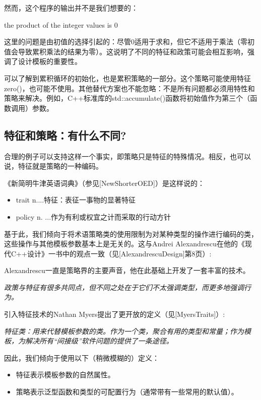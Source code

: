然而，这个程序的输出并不是我们想要的：

\begin{shell}
the product of the integer values is 0
\end{shell}

这里的问题是由初值的选择引起的：尽管0适用于求和，但它不适用于乘法（零初值会导致累积乘法的结果为零）。这说明了不同的特征和政策可能会相互影响，强调了设计模板的重要性。

可以了解到累积循环的初始化，也是累积策略的一部分。这个策略可能使用特征zero()，也可能不使用。其他替代方案也不能忽略：不是所有问题都必须用特性和策略来解决。例如，C++标准库的std::accumulate()函数将初始值作为第三个（函数调用）参数。

\subsection{特征和策略：有什么不同?}

合理的例子可以支持这样一个事实，即策略只是特征的特殊情况。相反，也可以说，特征就是策略的一种编码。

《新简明牛津英语词典》（参见[NewShorterOED]）是这样说的：

\begin{itemize}
\item 
trait n....特征：表征一事物的显著特征

\item 
policy n. ...作为有利或权宜之计而采取的行动方针
\end{itemize}

基于此，我们倾向于将术语策略类的使用限制为对某种类型的操作进行编码的类，这些操作与其他模板参数基本上是无关的。这与Andrei Alexandrescu在他的《现代C++设计》一书中的观点一致（见[AlexandrescuDesign]第8页）:

\begin{notice}
Alexandrescu一直是策略界的主要声音，他在此基础上开发了一套丰富的技术。
\end{notice}

\textit{政策与特征有很多共同点，但不同之处在于它们不太强调类型，而更多地强调行为。}

引入特征技术的Nathan Myers提出了更开放的定义（见[MyersTraits]）:

\textit{特征类：用来代替模板参数的类。作为一个类，聚合有用的类型和常量；作为模板，为解决所有“间接级”软件问题的提供了一条途径。}

因此，我们倾向于使用以下（稍微模糊的）定义：

\begin{itemize}
\item 
特征表示模板参数的自然属性。

\item 
策略表示泛型函数和类型的可配置行为（通常带有一些常用的默认值）。
\end{itemize}

